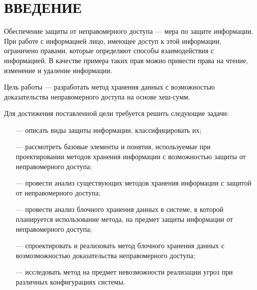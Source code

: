 \section*{ВВЕДЕНИЕ}

Обеспечение защиты от неправомерного доступа --- мера по защите информации. При работе с информацией лицо, имеющее доступ к этой информации, ограничено правами, которые определяют способы взаимодействия с информацией. В качестве примера таких прав можно привести права на чтение, изменение и удаление информации.

Цель работы --- разработать метод хранения данных с возможностью доказательства неправомерного доступа на основе хеш-сумм.

Для достижения поставленной цели требуется решить следующие задачи:
\begin{itemize}
	\item [---] описать виды защиты информации, классифицировать их;
	\item [---] рассмотреть базовые элементы и понятия, используемые при проектировании методов хранения информации с возможностью защиты от неправомерного доступа;
	\item [---] провести анализ существующих методов хранения информации с защитой от неправомерного доступа;
	\item [---] провести анализ блочного хранения данных в системе, в которой планируется использование метода, на предмет защиты информации от неправомерного доступа;
	\item [---] спроектировать и реализовать метод блочного хранения данных с возмозможностью доказательства неправомерного доступа;
	\item [---] исследовать метод на предмет невозможности реализации угроз при различных конфигурациях системы.
\end{itemize}
\pagebreak